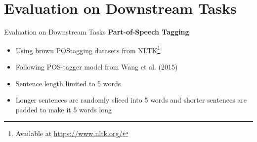 \documentclass{beamer}
\begin{document}
\section{Evaluation on Downstream Tasks}
\begin{frame}{Evaluation on Downstream Tasks}
    \textbf{Part-of-Speech Tagging}
    \begin{itemize}
        \item Using brown POStagging datasets from NLTK\footnote{Available at \url{https://www.nltk.org/}}
        \item Following POS-tagger model from Wang et al. (2015) \cite{finding2015ling}
        \item Sentence length limited to 5 words
        \item Longer sentences are randomly sliced into 5 words and
        shorter sentences are padded to make it 5 words long
    \end{itemize}
\end{frame}

\end{document}

